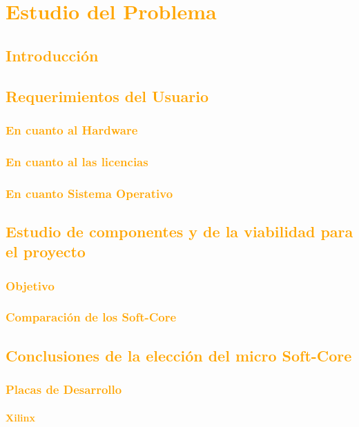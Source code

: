 \documentclass[a4paper,11pt]{article}
\begin{document}
\section{\textcolor{orange}{Estudio del Problema}}
	\subsection{\textcolor{orange}{Introducción}}
	\subsection{\textcolor{orange}{Requerimientos del Usuario}}
			\subsubsection{\textcolor{orange}{En cuanto al Hardware}}
			\subsubsection{\textcolor{orange}{En cuanto al las licencias}} 
			\subsubsection{\textcolor{orange}{En cuanto Sistema Operativo}} 	 
				 		\subsection{\textcolor{orange}{Estudio de componentes y de la viabilidad para el proyecto}}	
		\subsubsection{\textcolor{orange}{Objetivo}} 	 
		\subsubsection{\textcolor{orange}{Comparación de los Soft-Core}} 
	 	\subsection{\textcolor{orange}{Conclusiones de la elección del micro Soft-Core}}
 		\subsubsection{\textcolor{orange}{Placas de Desarrollo}}
			\paragraph{\textcolor{orange}{Xilinx}}
\end{document}
